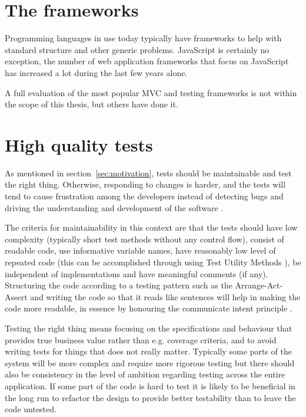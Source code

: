 \documentclass[11pt]{article}
\begin{document}
\section{The frameworks}

Programming languages in use today typically have frameworks to help with standard structure and other generic problems. JavaScript is certainly no exception, the number of web application frameworks that focus on JavaScript has increased a lot during the last few years alone.

A full evaluation of the most popular MVC and testing frameworks is not within the scope of this thesis, but others have done it. \cite{JackFranklin, SebastianPorto}

\section{High quality tests}
\label{sec:quality}

As mentioned in section~\ref{sec:motivation}, tests should be maintainable and test the right thing. Otherwise, responding to changes is harder, and the tests will tend to cause frustration among the developers instead of detecting bugs and driving the understanding and development of the software \cite{Clean}.

The criteria for maintainability in this context are that the tests should have low complexity (typically short test methods without any control flow), consist of readable code, use informative variable names, have reasonably low level of repeated code (this can be accomplished through using Test Utility Methods \cite[599]{TestPatterns}), be independent of implementations and have meaningful comments (if any). Structuring the code according to a testing pattern such as the Arrange-Act-Assert \cite{C2} and writing the code so that it reads like sentences will help in making the code more readable, in essence by honouring the communicate intent principle \cite[p.~41]{TestPatterns}.

Testing the right thing means focusing on the specifications and behaviour that provides true business value rather than e.g. coverage criteria, and to avoid writing tests for things that does not really matter. Typically some parts of the system will be more complex and require more rigorous testing but there should also be consistency in the level of ambition regarding testing across the entire application. If some part of the code is hard to test it is likely to be beneficial in the long run to refactor the design to provide better testability than to leave the code untested.
\end{document}
